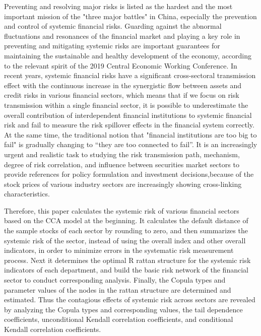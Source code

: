 \begin{eabstract}
Preventing and resolving major risks is listed as the hardest and the most important mission of the "three major battles" in China, especially the prevention and control of systemic financial risks. Guarding against the abnormal fluctuations and resonances of the financial market and playing a key role in preventing and mitigating systemic risks are important guarantees for maintaining the sustainable and healthy development of the economy, according to the relevant spirit of the 2019 Central Economic Working Conference. In recent years, systemic financial risks have a significant cross-sectoral transmission effect with the continuous increase in the synergistic flow between assets and credit risks in various financial sectors, which means that if we focus on risk transmission within a single financial sector, it is possible to underestimate the overall contribution of interdependent financial institutions to systemic financial risk and fail to measure the risk spillover effects in the financial system correctly. At the same time, the traditional notion that "financial institutions are too big to fail" is gradually changing to “they are too connected to fail”. It is an increasingly urgent and realistic task to studying the risk transmission path, mechanism, degree of risk correlation, and influence between securities market sectors to provide references for policy formulation and investment decisions,because of the stock prices of various industry sectors are increasingly showing cross-linking characteristics. 

Therefore, this paper calculates the systemic risk of various financial sectors based on the CCA model at the beginning. It calculates the default distance of the sample stocks of each sector by rounding to zero, and then summarizes the systemic risk of the sector, instead of using the overall index and other overall indicators, in order to minimize errors in the systematic risk measurement process. Next it determines the optimal R rattan structure for the systemic risk indicators of each department, and build the basic risk network of the financial sector to conduct corresponding analysis. Finally, the Copula types and parameter values of the nodes in the rattan structure are determined and estimated. Thus the contagious effects of systemic risk across sectors are revealed by analyzing the Copula types and corresponding values, the tail dependence coefficients, unconditional Kendall correlation coefficients, and conditional Kendall correlation coefficients. 


\end{eabstract}
